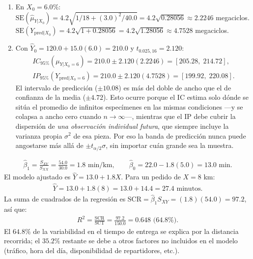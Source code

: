 \begin{solproblema}[prob:5c55133]
	\begin{enumerate}
		\item En $X_0=6.0\%$: $\text{SE}(\hat{\mu}_{Y|X_0})=4.2\sqrt{1/18+(3.0)^2/40.0}=4.2\sqrt{0.28056}\approx2.2246$ megaciclos. $\text{SE}(Y_{\text{pred}|X_0})=4.2\sqrt{1+0.28056}=4.2\sqrt{1.28056}\approx4.7528$ megaciclos.
		\item Con $\hat{Y}_0=120.0+15.0(6.0)=210.0$ y $t_{0.025,16}=2.120$:
		\begin{align}
			IC_{95\%}(\mu_{Y|X_0=6}) = 210.0\pm2.120(2.2246) = [205.28,\;214.72], \\
			IP_{95\%}(Y_{\text{pred}|X_0=6}) = 210.0\pm2.120(4.7528) = [199.92,\;220.08].
		\end{align}
		El intervalo de predicción ($\pm10.08$) es más del doble de ancho que el de confianza de la media ($\pm4.72$). Esto ocurre porque el IC estima solo dónde se sitúa el promedio de infinitos especímenes en las mismas condiciones —y se colapsa a ancho cero cuando $n\to\infty$—, mientras que el IP debe cubrir la dispersión de \emph{una observación individual futura}, que siempre incluye la varianza propia $\sigma^2$ de esa pieza. Por eso la banda de predicción nunca puede angostarse más allá de $\pm t_{\alpha/2}\sigma$, sin importar cuán grande sea la muestra.
	\end{enumerate}
\end{solproblema}

\begin{solproblema}[prob:58d3723]
	\begin{align}
		\hat{\beta}_1 = \frac{S_{XY}}{S_{XX}} = \frac{54.0}{30.0} = 1.8 \text{ min/km}, \qquad \hat{\beta}_0 = 22.0-1.8(5.0) = 13.0 \text{ min}.
	\end{align}
	El modelo ajustado es $\hat{Y}=13.0+1.8X$. Para un pedido de $X=8$ km:
	\begin{align}
		\hat{Y} = 13.0+1.8(8) = 13.0+14.4 = 27.4 \text{ minutos.}
	\end{align}
	La suma de cuadrados de la regresión es $\text{SCR}=\hat{\beta}_1S_{XY}=(1.8)(54.0)=97.2$, así que:
	\begin{align}
		R^2 = \frac{\text{SCR}}{\text{SCT}} = \frac{97.2}{150.0} = 0.648 \text{ (64.8\%).}
	\end{align}
	El $64.8\%$ de la variabilidad en el tiempo de entrega se explica por la distancia recorrida; el $35.2\%$ restante se debe a otros factores no incluidos en el modelo (tráfico, hora del día, disponibilidad de repartidores, etc.).
\end{solproblema}
